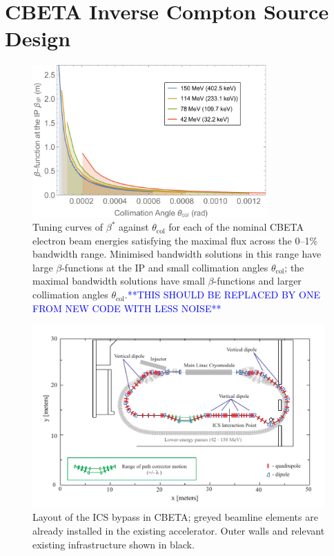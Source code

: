 \documentclass[../main.tex]{subfiles}
\begin{document}
\chapter{CBETA Inverse Compton Source Design}
\label{CBETA_Inverse_Compton_Source_Design} %

\begin{figure}
\centering
\includegraphics[width=0.8\textwidth]{Figures/CBETA_Inverse_Compton_Source_Design/CBETABetaTheta.pdf}
\caption{Tuning curves of $\beta^{*}$ against $\theta_{\mathrm{col}}$ for each of the nominal CBETA electron beam energies satisfying the maximal flux across the 0--1\% bandwidth range. Minimised bandwidth solutions in this range have large $\beta$-functions at the IP and small collimation angles $\theta_{\mathrm{col}}$; the maximal bandwidth solutions have small $\beta$-functions and larger collimation angles $\theta_{\mathrm{col}}$.\textcolor{blue}{**THIS SHOULD BE REPLACED BY ONE FROM NEW CODE WITH LESS NOISE**}}
\label{fig:CBETA_beta_theta_parameter_space}
\end{figure}


\begin{figure}[!htb]
\centering
\includegraphics[width=\textwidth]{Figures/CBETA_Inverse_Compton_Source_Design/cbetaicslayout.pdf}
\caption{Layout of the ICS bypass in CBETA; greyed beamline elements are already installed in the existing accelerator. Outer walls and relevant existing infrastructure shown in black.}
\label{fig:CBETA_ICS_Layout}
\end{figure}
\end{document}

